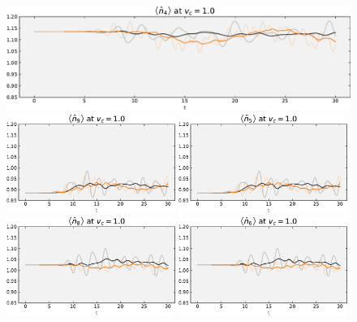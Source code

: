 \begin{figure}[!hbt]
\begin{minipage}[b]{.49\textwidth}
                \includegraphics[trim=0 0 0 -4, clip, width=1.00\textwidth]{graph/occupation/occupation_site_4_vc_10.pdf}
                \includegraphics[trim=0 0 0 -4, clip, width=0.49\textwidth]{graph/occupation/occupation_site_9_vc_10.pdf}
                \includegraphics[trim=0 0 0 -4, clip, width=0.49\textwidth]{graph/occupation/occupation_site_5_vc_10.pdf}
                \includegraphics[trim=0 0 0 -4, clip, width=0.49\textwidth]{graph/occupation/occupation_site_8_vc_10.pdf}
                \includegraphics[trim=0 0 0 -4, clip, width=0.49\textwidth]{graph/occupation/occupation_site_6_vc_10.pdf}

\end{minipage}
\end{figure}
